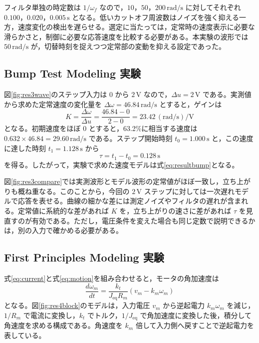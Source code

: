 フィルタ単独の時定数は $1/\omega_f$ なので，$10$，$50$，$200\,\mathrm{rad/s}$ に対してそれぞれ $0.100$，$0.020$，$0.005\,\mathrm{s}$ となる。低いカットオフ周波数はノイズを強く抑える一方，速度変化の検出を遅らせる。選定に当たっては，定常時の速度表示に必要な滑らかさと，制御に必要な応答速度を比較する必要がある。本実験の波形では $50\,\mathrm{rad/s}$ が，切替時刻を捉えつつ定常部の変動を抑える設定であった。

\subsection{Bump Test Modeling 実験}
図\ref{fig:res3wave}のステップ入力は $0$ から $2\,\mathrm{V}$ なので，$\Delta u=2\,\mathrm{V}$ である。実測値から求めた定常速度の変化量を $\Delta\omega=46.84\,\mathrm{rad/s}$ とすると，ゲインは
\begin{equation}
 K=\frac{\Delta\omega}{\Delta u}
 =\frac{46.84-0}{2-0}
 =23.42\,\mathrm{(rad/s)/V}
 \label{eq:discK}
\end{equation}
となる。初期速度をほぼ $0$ とすると，63.2\%に相当する速度は $0.632\times46.84=29.60\,\mathrm{rad/s}$ である。ステップ開始時刻 $t_0=1.000\,\mathrm{s}$ と，この速度に達した時刻 $t_1=1.128\,\mathrm{s}$ から
\begin{equation}
 \tau=t_1-t_0=0.128\,\mathrm{s}
 \label{eq:disctau}
\end{equation}
を得る。したがって，実験で求めた速度モデルは式\eqref{eq:resultbump}となる。

図\ref{fig:res3compare}では実測波形とモデル波形の定常値がほぼ一致し，立ち上がりも概ね重なる。このことから，今回の $2\,\mathrm{V}$ ステップに対しては一次遅れモデルで応答を表せる。曲線の細かな差には測定ノイズやフィルタの遅れが含まれる。定常値に系統的な差があれば $K$ を，立ち上がりの速さに差があれば $\tau$ を見直すのが有効である。ただし，電圧条件を変えた場合も同じ定数で説明できるかは，別の入力で確かめる必要がある。

\subsection{First Principles Modeling 実験}
式\eqref{eq:current}と式\eqref{eq:motion}を組み合わせると，モータの角加速度は
\begin{equation}
 \frac{d\omega_m}{dt}
 =\frac{k_t}{J_{\mathrm{eq}}R_m}
 \left(v_m-k_m\omega_m\right)
 \label{eq:discphysical}
\end{equation}
となる。図\ref{fig:res4block}のモデルは，入力電圧 $v_m$ から逆起電力 $k_m\omega_m$ を減じ，$1/R_m$ で電流に変換し，$k_t$ でトルク，$1/J_{\mathrm{eq}}$ で角加速度に変換した後，積分して角速度を求める構成である。角速度を $k_m$ 倍して入力側へ戻すことで逆起電力を表している。


